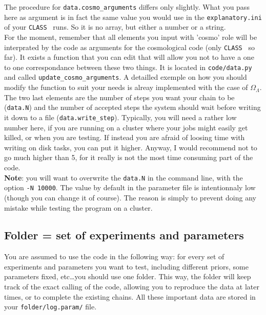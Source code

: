 \documentclass[10pt]{article}
\newcommand{\CLASS}{\texttt{CLASS}}
\begin{document}
  The procedure for \verb?data.cosmo_arguments? differs only slightly. What you
  pass here as argument is in fact the same value you would use in the
  \verb?explanatory.ini? of your \CLASS~ runs. So it is no array, but either a
  number or a string.\\

  For the moment, remember that all elements you input with 'cosmo' role will
  be interprated by the code as arguments for the cosmological code (only
  \CLASS~ so far). It exists a function that you can edit that will allow you
  not to have a one to one correspondance between these two things. It is
  located in \verb?code/data.py? and called \verb?update_cosmo_arguments?. A
  detailled exemple on how you should modify the function to suit your needs is
  alreay implemented with the case of $\Omega_{\Lambda}$.\\

  The two last elements are the number of steps you want your chain to be
  (\verb?data.N?) and the number of accepted steps the system should wait
  before writing it down to a file (\verb?data.write_step?). Typically, you
  will need a rather low number here, if you are running on a cluster where
  your jobs might easily get killed, or when you are testing. If instead you
  are afraid of loosing time with writing on disk tasks, you can put it higher.
  Anyway, I would recommend not to go much higher than 5, for it really is not
  the most time consuming part of the code.\\

  {\bf Note}: you will want to overwrite the \verb?data.N? in the command line,
  with the option \verb?-N 10000?. The value by default in the parameter file
  is intentionnaly low (though you can change it of course). The reason is
  simply to prevent doing any mistake while testing the program on a cluster.

  \subsection{Folder = set of experiments and parameters}
  
  You are assumed to use the code in the following way: for every set of
  experiments and parameters you want to test, including different priors, some
  parameters fixed, etc\ldots you should use one folder. This way, the folder
  will keep track of the exact calling of the code, allowing you to reproduce
  the data at later times, or to complete the existing chains. All these
  important data are stored in your \verb?folder/log.param/? file.\\
\end{document}
